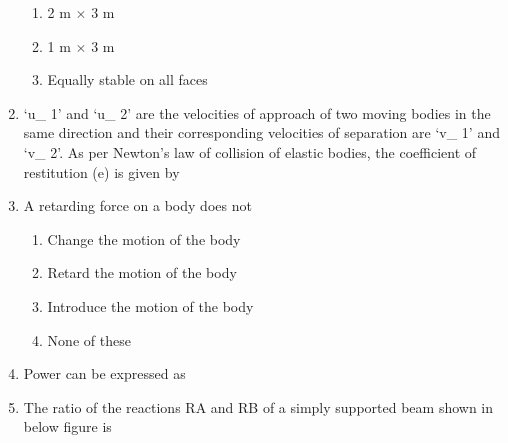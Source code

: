 \documentclass[11pt,a4paper]{article}
\begin{document}
\begin{enumerate}
\begin{enumerate}[label=\Alph*.]
\item{2 m $\times$ 3 m}
\item{1 m $\times$ 3 m}
\item{Equally stable on all faces}
\end{enumerate}
\item{`u\_ 1' and `u\_ 2' are the velocities of approach of two moving bodies in the same direction and their corresponding velocities of separation are `v\_ 1' and `v\_ 2'. As per Newton's law of collision of elastic bodies, the coefficient of restitution (e) is given by
}
\\
\item{A retarding force on a body does not}
\begin{enumerate}[label=\Alph*.]
\item{Change the motion of the body}
\item{Retard the motion of the body}
\item{Introduce the motion of the body}
\item{None of these}
\end{enumerate}
\item{Power can be expressed as}
\\
\item{The ratio of the reactions RA and RB of a simply supported beam shown in below figure is \\
}
\end{enumerate}
\end{document}
